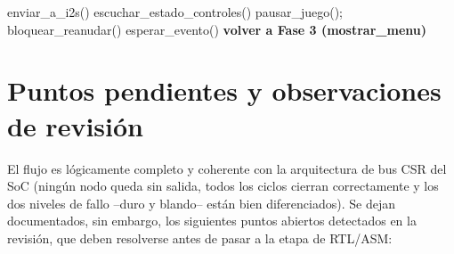 \documentclass[11pt,a4paper]{article}
\begin{document}
\begin{algorithm}[H]
\caption{Fase 4 --- Ejecuci\'on, audio y hot-plugging}
\begin{algorithmic}[1]
     enviar\_a\_i2s() \EndIf
    \State escuchar\_estado\_controles()
        \State pausar\_juego(); bloquear\_reanudar()
        \Repeat
            \State esperar\_evento()
            \State \textbf{volver a Fase 3 (mostrar\_menu)}
        \EndIf
    \EndIf
\EndWhile
\end{algorithmic}
\end{algorithm}

\section{Puntos pendientes y observaciones de revisi\'on}
\label{sec:pendientes}

El flujo es l\'ogicamente completo y coherente con la arquitectura de bus CSR
del SoC (ning\'un nodo queda sin salida, todos los ciclos cierran correctamente
y los dos niveles de fallo --duro y blando-- est\'an bien diferenciados). Se
dejan documentados, sin embargo, los siguientes puntos abiertos detectados en
la revisi\'on, que deben resolverse antes de pasar a la etapa de RTL/ASM:
\end{document}
